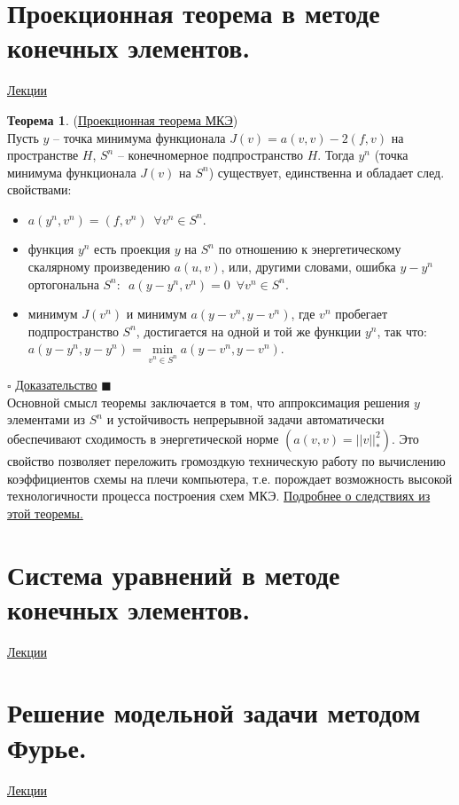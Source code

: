 \documentclass[specialist, subf, href, colorlinks=true, 12pt, times, mtpro, final]{disser}
\theoremstyle{definition}
\newtheorem{theorem}{Теорема}[section]
\begin{document}
\section {Проекционная теорема в методе конечных элементов.}
	\hyperlink {lects.103}{Лекции}
	\begin{theorem} (\hyperlink {lects.103}{Проекционная теорема МКЭ})\\
	Пусть $y$ -- точка минимума функционала $J(v) = a(v,v) - 2(f,v)$ на пространстве
	$H$, $S^n$ -- конечномерное подпространство $H$. Тогда $y^n$ (точка минимума
	функционала $J(v)$ на $S^n$) существует, единственна и обладает след. свойствами:
	\begin{itemize}
	\item $a(y^n,v^n) = (f,v^n)\,\,\, \forall v^n \in S^n$.
	\item функция $y^n$ есть проекция $y$ на $S^n$ по отношению к энергетическому скалярному
	произведению $a(u,v)$, или, другими словами, ошибка $y-y^n$ ортогональна $S^n$:\,\,
	$a(y-y^n,v^n) = 0 \,\,\, \forall v^n \in S^n$.
	\item минимум $J(v^n)$ и минимум $a(y-v^n, y-v^n)$, где $v^n$ пробегает подпространство
	$S^n$, достигается на одной и той же функции $y^n$, так что:
	$a(y-y^n,y-y^n) = \min\limits_{v^n\in S^n} a(y-v^n,y-v^n)$.
	\end{itemize}
	\end{theorem}
	\noindent$\square$ \hyperlink {lects.104}{Доказательство} $\blacksquare$\\
	Основной смысл теоремы заключается в том, что аппроксимация решения $y$ элементами
	из $S^n$ и устойчивость непрерывной задачи автоматически обеспечивают сходимость в
	энергетической норме $(a(v,v) = ||v||_*^2)$. Это свойство позволяет переложить
	громоздкую техническую работу по вычислению коэффициентов схемы на плечи компьютера,
	т.е. порождает возможность высокой технологичности процесса построения схем МКЭ.
	\hyperlink {lects.105}{Подробнее о следствиях из этой теоремы.}

\section {Система уравнений в методе конечных элементов.}
	\hyperlink {lects.106}{Лекции}\\

\section {Решение модельной задачи методом Фурье.}
	\hyperlink {lects.108}{Лекции}\\
\end{document}
